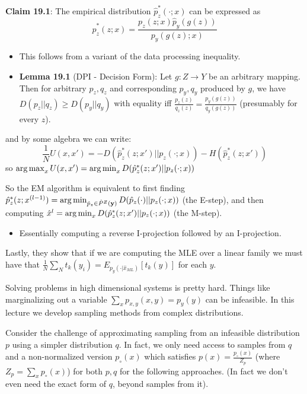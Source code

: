 \documentclass[12pt]{article} %
\begin{document}
\textbf{Claim 19.1}: The empirical distribution $\hat{p}_z^*(\cdot;x)$ can be expressed as
\begin{equation*}
    \hat{p}_z^*(z;x)
    = \frac{p_z(z;x) \hat{p}_y(g(z))}{p_y(g(z);x)}
\end{equation*}
\begin{itemize}[topsep=-1pt, itemsep=-1pt]
    \item This follows from a variant of the data processing inequality.
    \item \textbf{Lemma 19.1} (DPI - Decision Form): Let $g: Z \rightarrow Y$ be an arbitrary mapping. Then for arbitrary $p_z,q_z$ and corresponding $p_y, q_y$ produced by $g$, we have $D(p_z || q_z) \geq D(p_y || q_y)$ with equality iff $\frac{p_z(z)}{q_z(z)} = \frac{p_y(g(z))}{q_y(g(z))}$ (presumably for every $z$). 
\end{itemize}
and by some algebra we can write:
\begin{equation*}
    \frac{1}{N}U(x,x') = - D(
    \hat{p}_z^*(z;x')
    ||
    p_z(\cdot;x)
    )
    - H(\hat{p}_z^*(z;x'))
\end{equation*}
so $\operatorname*{arg\,max}_x U(x,x') = \operatorname*{arg\,min}_x D(\hat{p}_z^*(z;x') || p_z(\cdot;x))$

So the EM algorithm is equivalent to first finding $\hat{p}_z^*(z;x^{(l-1)}) = \operatorname*{arg\,min}_{\hat{p}_z \in \hat{P}^Z(\mathbf{y})} D(\hat{p}_z(\cdot) || p_z(\cdot;x))$ (the E-step), and then computing $\hat{x}^{l} = \operatorname*{arg\,min}_x D(\hat{p}_z^*(z;x') || p_z(\cdot;x))$ (the M-step).
\begin{itemize}[topsep=-1pt, itemsep=-1pt]
    \item Essentially computing a reverse I-projection followed by an I-projection.
\end{itemize}


\separate

Lastly, they show that if we are computing the MLE over a linear family we must have that $\frac{1}{N} \sum_N t_k(y_i) = E_{p_y(\cdot| \hat{x}_{ML})}[t_k(y)]$ for each $y$.


\newpage
{}
Solving problems in high dimensional systems is pretty hard. Things like marginalizing out a variable $\sum_x p_{x,y}(x,y) = p_y(y)$ can be infeasible. In this lecture we develop sampling methods from complex distributions.

\separate

Consider the challenge of approximating sampling from an infeasible distribution $p$ using a simpler distribution $q$. In fact, we only need access to samples from $q$ and a non-normalized version $p_\circ(x)$ which satisfies $p(x) = \frac{p_\circ(x)}{Z_p}$ (where $Z_p = \sum_x p_\circ(x)$) for both $p,q$ for the following approaches. (In fact we don't even need the exact form of $q$, beyond samples from it).
\end{document}
